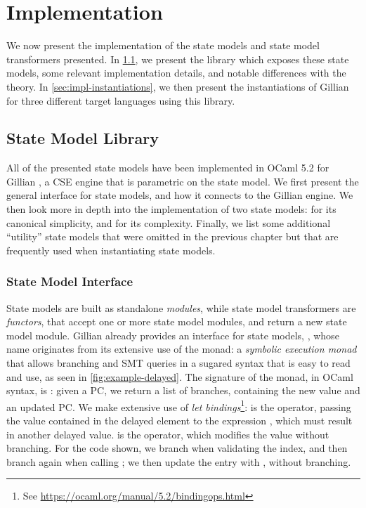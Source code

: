 \chapter{Implementation}

We now present the implementation of the state models and state model transformers presented. In \cref{sec:state-model-lib}, we present the library which exposes these state models, some relevant implementation details, and notable differences with the theory. In \cref{sec:impl-instantiations}, we then present the instantiations of Gillian for three different target languages using this library.

\section{State Model Library} \label{sec:state-model-lib}

All of the presented state models have been implemented in OCaml 5.2 \cite{ocaml} for Gillian \cite{gillian0,gillian1,gillian2}, a CSE engine that is parametric on the state model. We first present the general interface for state models, and how it connects to the Gillian engine. We then look more in depth into the implementation of two state models: \Ex{} for its canonical simplicity, and \PMap{} for its complexity. Finally, we list some additional ``utility'' state models that were omitted in the previous chapter but that are frequently used when instantiating state models.

\subsection{State Model Interface}

State models are built as standalone \emph{modules}, while state model transformers are \emph{functors}, that accept one or more state model modules, and return a new state model module. Gillian already provides an interface for state models, , whose name originates from its extensive use of the  monad: a \emph{symbolic execution monad} that allows branching and SMT queries in a sugared syntax that is easy to read and use, as seen in \autoref{fig:example-delayed}. The signature of the monad, in OCaml syntax, is : given a PC, we return a list of branches, containing the new value and an updated PC. We make extensive use of \emph{let bindings}\footnote{See \url{https://ocaml.org/manual/5.2/bindingops.html}}:  is the  operator, passing the value  contained in the delayed element  to the expression , which must result in another delayed value.  is the  operator, which modifies the value without branching. For the code shown, we branch when validating the index, and then branch again when calling ; we then update the entry with , without branching.

